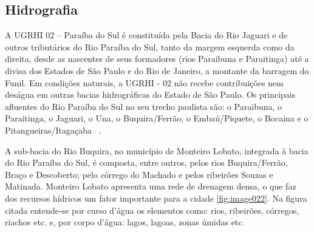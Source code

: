 \subsection{Hidrografia}

A UGRHI  02 – Paraíba do Sul é constituída pela Bacia do Rio Jaguari e de outros tributários do Rio Paraíba do Sul, tanto da margem esquerda como da direita, desde as nascentes de seus formadores (rios Paraibuna e Paraitinga) até a divisa dos Estados de São Paulo e do Rio de Janeiro, a montante da barragem do Funil. Em condições naturais, a UGRHI - 02 não recebe contribuições nem deságua em outras bacias hidrográficas do Estado de São Paulo. Os principais afluentes do Rio Paraíba do Sul no seu trecho paulista são: o Paraibuna, o Paraitinga, o Jaguari, o Una, o Buquira/Ferrão, o Embaú/Piquete, o Bocaina e o Pitangueiras/Itagaçaba ~\cite{MonteiroLobato2014}.

A sub-bacia do Rio Buquira, no município de Monteiro Lobato, integrada à bacia do Rio Paraíba do Sul, é composta, entre outros, pelos rios Buquira/Ferrão, Braço e Descoberto; pelo córrego do Machado e pelos ribeirões Souzas e Matinada. Monteiro Lobato apresenta uma rede de drenagem densa, o que faz dos recursos hídricos um fator importante para a cidade \autoref{fig:image022}. Na figura citada entende-se por curso d’água os elementos como: rios, ribeirões, córregos, riachos etc. e, por corpo d’água:  lagos, lagoas, zonas úmidas etc. 

